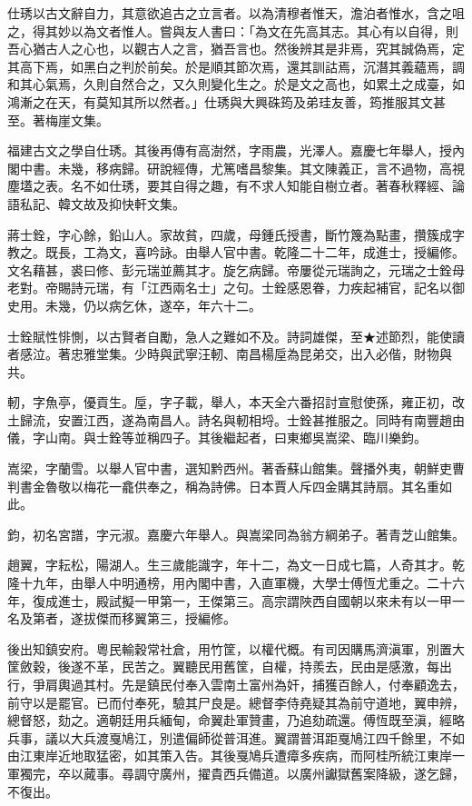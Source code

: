 \begin{pinyinscope}
仕琇以古文辭自力，其意欲追古之立言者。以為清穆者惟天，澹泊者惟水，含之咀之，得其妙以為文者惟人。嘗與友人書曰：「為文在先高其志。其心有以自得，則吾心猶古人之心也，以觀古人之言，猶吾言也。然後辨其是非焉，究其誠偽焉，定其高下焉，如黑白之判於前矣。於是順其節次焉，還其訓詁焉，沉潛其義蘊焉，調和其心氣焉，久則自然合之，又久則變化生之。於是文之高也，如累土之成臺，如鴻漸之在天，有莫知其所以然者。」仕琇與大興硃筠及弟珪友善，筠推服其文甚至。著梅崖文集。

福建古文之學自仕琇。其後再傳有高澍然，字雨農，光澤人。嘉慶七年舉人，授內閣中書。未幾，移病歸。研說經傳，尤篤嗜昌黎集。其文陳義正，言不過物，高視塵壒之表。名不如仕琇，要其自得之趣，有不求人知能自樹立者。著春秋釋經、論語私記、韓文故及抑快軒文集。

蔣士銓，字心餘，鉛山人。家故貧，四歲，母鍾氏授書，斷竹篾為點畫，攢簇成字教之。既長，工為文，喜吟詠。由舉人官中書。乾隆二十二年，成進士，授編修。文名藉甚，裘曰修、彭元瑞並薦其才。旋乞病歸。帝屢從元瑞詢之，元瑞之士銓母老對。帝賜詩元瑞，有「江西兩名士」之句。士銓感恩眷，力疾起補官，記名以御史用。未幾，仍以病乞休，遂卒，年六十二。

士銓賦性悱惻，以古賢者自勵，急人之難如不及。詩詞雄傑，至★述節烈，能使讀者感泣。著忠雅堂集。少時與武寧汪軔、南昌楊垕為昆弟交，出入必偕，財物與共。

軔，字魚亭，優貢生。垕，字子載，舉人，本天全六番招討宣慰使孫，雍正初，改土歸流，安置江西，遂為南昌人。詩名與軔相埒。士銓甚推服之。同時有南豐趙由儀，字山南。與士銓等並稱四子。其後繼起者，曰東鄉吳嵩梁、臨川樂鈞。

嵩梁，字蘭雪。以舉人官中書，選知黔西州。著香蘇山館集。聲播外夷，朝鮮吏曹判書金魯敬以梅花一龕供奉之，稱為詩佛。日本賈人斥四金購其詩扇。其名重如此。

鈞，初名宮譜，字元淑。嘉慶六年舉人。與嵩梁同為翁方綱弟子。著青芝山館集。

趙翼，字耘松，陽湖人。生三歲能識字，年十二，為文一日成七篇，人奇其才。乾隆十九年，由舉人中明通榜，用內閣中書，入直軍機，大學士傅恆尤重之。二十六年，復成進士，殿試擬一甲第一，王傑第三。高宗謂陜西自國朝以來未有以一甲一名及第者，遂拔傑而移翼第三，授編修。

後出知鎮安府。粵民輸穀常社倉，用竹筐，以權代概。有司因購馬濟滇軍，別置大筐斂穀，後遂不革，民苦之。翼聽民用舊筐，自權，持羨去，民由是感激，每出行，爭肩輿過其村。先是鎮民付奉入雲南土富州為奸，捕獲百餘人，付奉顧逸去，前守以是罷官。已而付奉死，驗其尸良是。總督李侍堯疑其為前守道地，翼申辨，總督怒，劾之。適朝廷用兵緬甸，命翼赴軍贊畫，乃追劾疏還。傅恆既至滇，經略兵事，議以大兵渡戛鳩江，別遣偏師從普洱進。翼謂普洱距戛鳩江四千餘里，不如由江東岸近地取猛密，如其策入告。其後戛鳩兵遭瘴多疾病，而阿桂所統江東岸一軍獨完，卒以蕆事。尋調守廣州，擢貴西兵備道。以廣州讞獄舊案降級，遂乞歸，不復出。


\end{pinyinscope}
